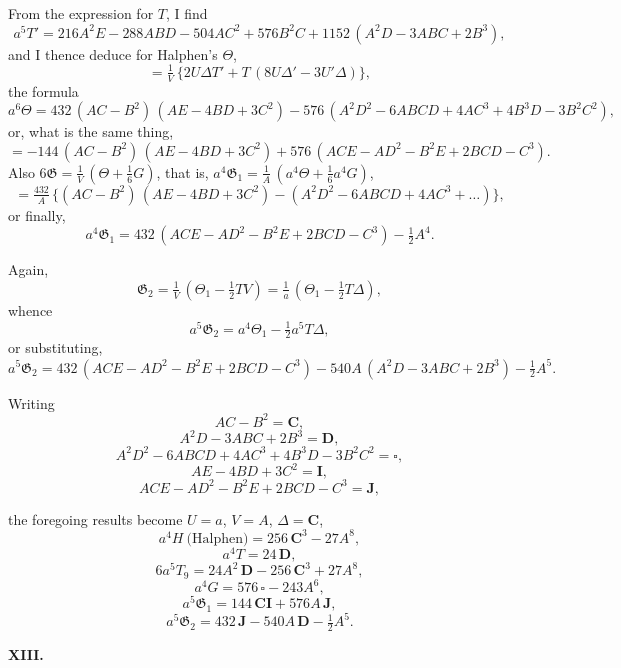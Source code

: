 \documentclass[11pt]{article}
\begin{document}
From the expression for $T$, I find
\[
a^5 T' = 216 A^2 E - 288 A B D - 504 A C^2 + 576 B^2 C + 1152\,(A^2 D - 3 A B C + 2 B^3),
\]
and I thence deduce for Halphen's $\Theta$,
\[
= \tfrac{1}{V}\,\{2 U \Delta T' + T\,(8 U \Delta' - 3 U' \Delta)\},
\]
the formula
\[
a^6 \Theta = 432\,(A C - B^2)\,(A E - 4 B D + 3 C^2) - 576\,(A^2 D^2 - 6 A B C D + 4 A C^3 + 4 B^3 D - 3 B^2 C^2),
\]
or, what is the same thing,
\[
= -144\,(A C - B^2)\,(A E - 4 B D + 3 C^2) + 576\,(A C E - A D^2 - B^2 E + 2 B C D - C^3).
\]
Also $6\mathfrak{G} = \tfrac{1}{V}\,(\Theta + \tfrac{1}{6} G)$, that is, $a^4\mathfrak{G}_1 = \tfrac{1}{A}\,(a^4\Theta + \tfrac{1}{6} a^4 G)$,
\[
= \tfrac{432}{A}\,\{(A C - B^2)\,(A E - 4 B D + 3 C^2) - (A^2 D^2 - 6 A B C D + 4 A C^3 + \ldots)\},
\]
or finally,
\[
a^4\mathfrak{G}_1 = 432\,(A C E - A D^2 - B^2 E + 2 B C D - C^3) - \tfrac{1}{2} A^4.
\]

Again,
\[
\mathfrak{G}_2 = \tfrac{1}{V}\,(\Theta_1 - \tfrac{1}{2} T V) = \tfrac{1}{a}\,(\Theta_1 - \tfrac{1}{2} T \Delta),
\]
whence
\[
a^5\mathfrak{G}_2 = a^4\Theta_1 - \tfrac{1}{2} a^5 T \Delta,
\]
or substituting,
\[
a^5\mathfrak{G}_2 = 432\,(A C E - A D^2 - B^2 E + 2 B C D - C^3) - 540 A\,(A^2 D - 3 A B C + 2 B^3) - \tfrac{1}{2} A^5.
\]

Writing
\[
A C - B^2 = \mathbf{C},
\]
\[
A^2 D - 3 A B C + 2 B^3 = \mathbf{D},
\]
\[
A^2 D^2 - 6 A B C D + 4 A C^3 + 4 B^3 D - 3 B^2 C^2 = \square,
\]
\[
A E - 4 B D + 3 C^2 = \mathbf{I},
\]
\[
A C E - A D^2 - B^2 E + 2 B C D - C^3 = \mathbf{J},
\]

the foregoing results become $U = a$, $V = A$, $\Delta = \mathbf{C}$,
\[
a^4 H\ \text{(Halphen)} = 256\,\mathbf{C}^3 - 27 A^8,
\]
\[
a^4 T = 24\,\mathbf{D},
\]
\[
6 a^5 T_9 = 24 A^2\,\mathbf{D} - 256\,\mathbf{C}^3 + 27 A^8,
\]
\[
a^4 G = 576\,\square - 243 A^6,
\]
\[
a^5\mathfrak{G}_1 = 144\,\mathbf{C}\mathbf{I} + 576 A\,\mathbf{J},
\]
\[
a^5\mathfrak{G}_2 = 432\,\mathbf{J} - 540 A\,\mathbf{D} - \tfrac{1}{2} A^5.
\]

\medskip
\begin{center}\textbf{XIII.}\end{center}
\end{document}
